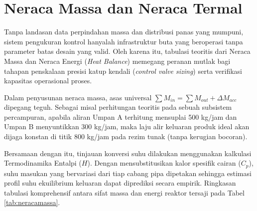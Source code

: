 \documentclass[12pt, a4paper]{report}
\begin{document}
\section{Neraca Massa dan Neraca Termal}
Tanpa landasan data perpindahan massa dan distribusi panas yang mumpuni, sistem pengukuran kontrol hanyalah infrastruktur buta yang beroperasi tanpa parameter batas desain yang valid. Oleh karena itu, tabulasi teoritis dari Neraca Massa dan Neraca Energi (\textit{Heat Balance}) memegang peranan mutlak bagi tahapan penskalaan presisi katup kendali (\textit{control valve sizing}) serta verifikasi kapasitas operasional proses.

Dalam penyusunan neraca massa, asas universal $\sum M_{in} = \sum M_{out} + \Delta M_{acc}$ dipegang teguh. Sebagai misal perhitungan teoritis pada sebuah subsistem percampuran, apabila aliran Umpan A terhitung mensuplai 500 kg/jam dan Umpan B menyuntikkan 300 kg/jam, maka laju alir keluaran produk ideal akan dijaga konstan di titik 800 kg/jam pada rezim tunak (tanpa kerugian bocoran).

Bersamaan dengan itu, tinjauan konversi suhu dilakukan menggunakan kalkulasi Termodinamika Entalpi ($H$). Dengan mensubstitusikan kalor spesifik cairan ($C_p$), suhu masukan yang bervariasi dari tiap cabang pipa dipetakan sehingga estimasi profil suhu ekuilibrium keluaran dapat diprediksi secara empirik. Ringkasan tabulasi komprehensif antara sifat massa dan energi reaktor tersaji pada Tabel \ref{tab:neracamassa}.

\begin{table}[htbp]
\centering
\caption{Ringkasan Neraca Massa dan Energi pada Reaktor ZXY}
\label{tab:neracamassa}
\end{table}
\end{document}
